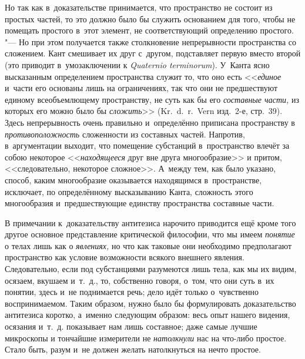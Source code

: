 Но так как в~доказательстве принимается, что пространство не состоит из
простых частей, то это должно было бы служить основанием для того, чтобы не
помещать простого в~этот элемент, не соответствующий определению простого.
"--- Но при этом получается также столкновение непрерывности пространства со
сложением. Кант смешивает их друг с~другом, подставляет первую вместо
второй (это приводит в~умозаключении к {\em Quaternio terminorum}). У~Канта
ясно высказанным определением пространства служит то,
что оно есть <<{\em единое} и~части его основаны лишь на
ограничениях, так что они не предшествуют единому всеобъемлющему
пространству, не суть как бы его {\em составные части,}
из которых его можно было бы {\em сложить}>> (Kr.~d.~r.~Vern
изд.~2-е, стр.~39). Здесь непрерывность очень правильно и~определённо
приписана пространству в {\em противоположность}
сложенности из составных частей. Напротив, в~аргументации выходит, что
помещение субстанций в~пространство влечёт за собою некоторое
<<{\em находящееся} друг вне друга многообразие>> и
притом, <<следовательно, некоторое сложное>>. А~между тем, как было указано,
способ, каким многообразие оказывается находящимся в~пространстве,
исключает, по определённому высказыванию Канта, сложность этого
многообразия и~предшествующие единству пространства составные части.

В примечании к~доказательству антитезиса нарочито приводится ещё кроме того
другое основное представление критической философии, что мы имеем {\em понятие}
о телах лишь как о {\em явлениях,} но что как таковые они необходимо
предполагают пространство как условие возможности всякого внешнего явления.
Следовательно, если под субстанциями разумеются лишь тела, как мы их видим,
осязаем, вкушаем и~т.~д., то, собственно говоря, о~том, что они суть в~их
понятии, здесь и~не поднимается речь; дело идёт только о~чувственно
воспринимаемом. Таким образом, нужно было бы формулировать доказательство
антитезиса коротко, а~именно следующим образом: весь опыт нашего видения,
осязания и~т.~д. показывает нам лишь составное; даже самые лучшие микроскопы и
тончайшие измерители не {\em натолкнули} нас на что-либо простое. Стало быть,
разум и~не должен желать натолкнуться на нечто простое.

